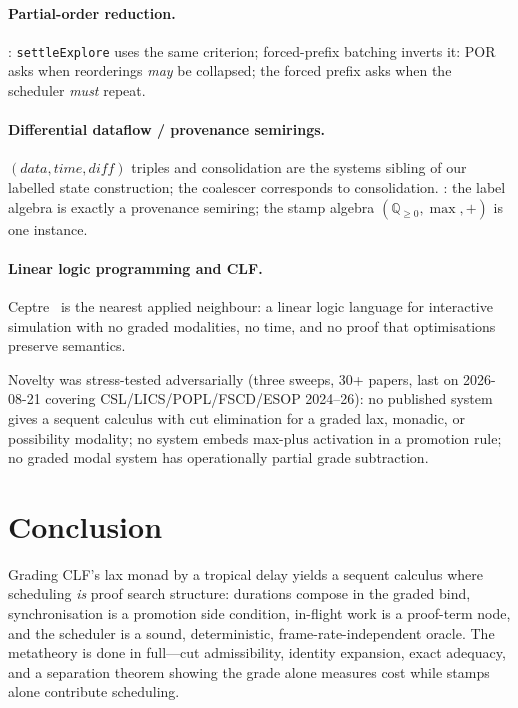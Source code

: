 \documentclass[11pt]{article}
\newcommand{\QQ}{\mathbb{Q}}                     %
\theoremstyle{definition}
\theoremstyle{remark}
\begin{document}
\paragraph{Partial-order reduction.}
\cite{Peled1993}: \texttt{settleExplore} uses the same criterion; forced-prefix
batching inverts it: POR asks when reorderings \emph{may} be collapsed; the
forced prefix asks when the scheduler \emph{must} repeat.

\paragraph{Differential dataflow / provenance semirings.}
\cite{MurrayMcSherry2013} $(\mathit{data}, \mathit{time}, \mathit{diff})$ triples
and consolidation are the systems sibling of our labelled state construction;
the coalescer corresponds to consolidation.
\cite{GreenKarvounarakisTannen2007}: the label algebra is exactly a provenance
semiring; the stamp algebra $(\QQ_{\geq 0}, \max, +)$ is one instance.

\paragraph{Linear logic programming and CLF.}
Ceptre~\cite{Martens2015} is the nearest applied neighbour: a linear logic language
for interactive simulation with no graded modalities, no time, and no proof that
optimisations preserve semantics.

\medskip
\noindent Novelty was stress-tested adversarially (three sweeps, 30+ papers, last
on 2026-08-21 covering CSL/LICS/POPL/FSCD/ESOP 2024--26): no published system
gives a sequent calculus with cut elimination for a graded lax, monadic, or
possibility modality; no system embeds max-plus activation in a promotion rule; no
graded modal system has operationally partial grade subtraction.

\section{Conclusion}
\label{sec:conclusion}

Grading CLF's lax monad by a tropical delay yields a sequent calculus where
scheduling \emph{is} proof search structure: durations compose in the graded bind,
synchronisation is a promotion side condition, in-flight work is a proof-term node,
and the scheduler is a sound, deterministic, frame-rate-independent oracle.  The
metatheory is done in full---cut admissibility, identity expansion, exact
adequacy, and a separation theorem showing the grade alone measures cost while
stamps alone contribute scheduling.
\end{document}
